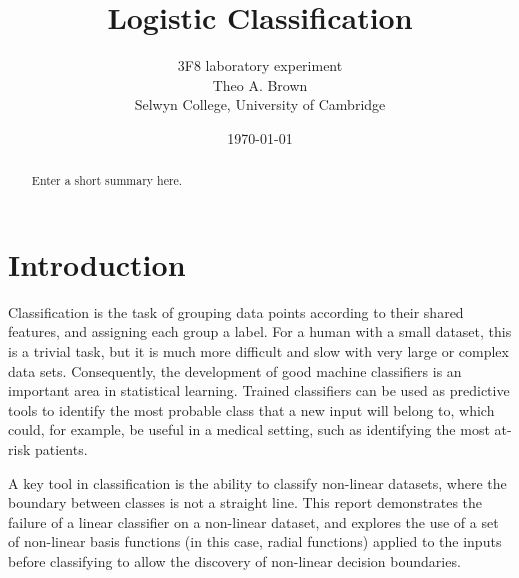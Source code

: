 \documentclass[a4paper]{article}
\begin{document}
    \title{Logistic Classification}
    \author{3F8 laboratory experiment \\ Theo A. Brown \\ Selwyn College, University of Cambridge}
    \date{\today}
    \maketitle

    \begin{abstract}
        Enter a short summary here.
    \end{abstract}

    \section{Introduction}\label{sec:introduction}
    Classification is the task of grouping data points according to their shared features, and assigning each group
    a label. For a human with a small dataset, this is a trivial task, but it is much more difficult and slow with very
    large or complex data sets. Consequently, the development of good machine classifiers is an important area in
    statistical learning. Trained classifiers can be used as predictive tools to identify the most probable class that a
    new input will belong to, which could, for example, be useful in a medical setting, such as identifying the most
    at-risk patients.

    A key tool in classification is the ability to classify non-linear datasets, where the boundary between classes
    is not a straight line. This report demonstrates the failure of a linear classifier on a non-linear dataset, and
    explores the use of a set of non-linear basis functions (in this case, radial functions) applied to the inputs before
    classifying to allow the discovery of non-linear decision boundaries.
\end{document}
